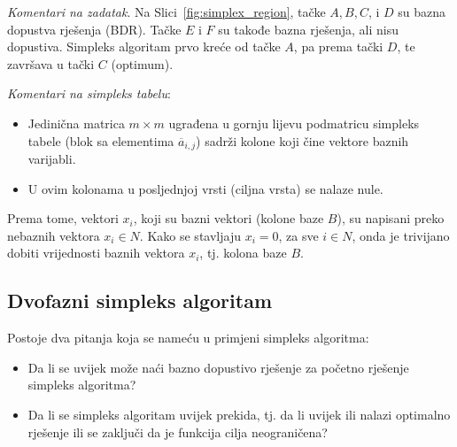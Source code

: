 \documentclass[a4paper, utf8, 11pt, colorlinks]{article}
\begin{document}
 \emph{Komentari na zadatak}. Na Slici~\ref{fig:simplex_region}, tačke $A, B, C$, i $D$ su bazna dopustva rješenja (BDR). Tačke $E$ i $F$ su takođe bazna rješenja, ali nisu dopustiva. Simpleks algoritam prvo kreće od tačke $A$, pa prema tački $D$, te završava u tački $C$ (optimum).
 
 \emph{Komentari na simpleks tabelu}:
 \begin{itemize}
     \item Jedinična matrica $m \times m$   ugrađena u gornju lijevu podmatricu simpleks tabele (blok sa elementima $\overline{a}_{i,j}$) sadrži kolone koji čine vektore baznih varijabli.
     \item U ovim kolonama u posljednjoj vrsti (ciljna vrsta) se nalaze nule.
 \end{itemize}
 Prema tome, vektori $x_i$, koji su bazni vektori (kolone baze $B$), su napisani preko nebaznih vektora $x_i \in N$. Kako se stavljaju $x_i  = 0$, za sve $i \in N$, onda je trivijano dobiti vrijednosti baznih vektora $x_i$, tj. kolona baze $B$. 
 
 \subsection{Dvofazni simpleks algoritam}
 Postoje dva pitanja koja se nameću u primjeni simpleks algoritma:
 \begin{itemize}
     \item Da li se uvijek može naći bazno dopustivo rješenje za početno rješenje 
     simpleks algoritma?
     \item Da li se simpleks algoritam uvijek prekida, tj. da li uvijek ili nalazi optimalno rješenje ili se zaključi da je funkcija cilja neograničena?
 \end{itemize}
 
\end{document}
